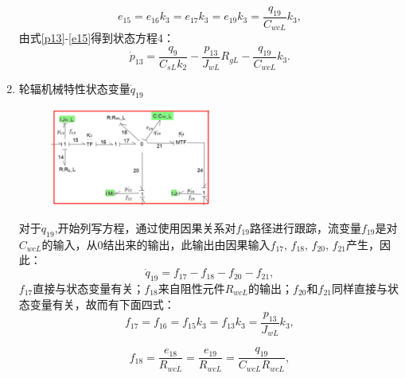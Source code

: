 \begin{enumerate}
\begin{equation}\label{e15}
e _ { 15 } = e _ { 16 } k _ { 3 } = e _ { 17 } k _ { 3 } = e _ { 19 } k _ { 3 } = \frac { q _ { 19 } } { C _ { w cL }  } k _ { 3 } ,
\end{equation}
由式\ref{p13}-\ref{e15}得到状态方程4：
\begin{equation}
\dot{ p }_ { 13 } = \frac { q _ { 9 } } { C _ { sL}  k _ { 2 } } - \frac { p _ { 13 } } { J _ { wL}  } R _ { gL }  - \frac { q _ { 19 } } { C _ { w cL}  } k _ { 3 }.
\end{equation}

\item{轮辐机械特性状态变量$\dot{ q}_{19}$}
\begin{figure}[h]
	\centering
	\includegraphics[width=0.5\textwidth]{fig/equation5.png}
	\caption{}\label{fig:equation5}
\end{figure}
对于$\dot{q} _ { 19 }$,开始列写方程，通过使用因果关系对$f_{19}$路径进行跟踪，流变量$f_{19}$是对$C_{wcL}$的输入，从0结出来的输出，此输出由因果输入$f _ { 17 }$, $f _ { 18 }$, $ f _ { 20 }$, $  f _ { 21 }$产生，因此：
\begin{equation}\label{q19}
\dot { q } _ { 19 } = f _ { 17 } - f _ { 18 } - f _ { 20 } - f _ { 21 },
\end{equation}
$f_{17}$直接与状态变量有关；$f_{18}$来自阻性元件$R _ { wcL }$的输出；$f_{20}$和$f_{21}$同样直接与状态变量有关，故而有下面四式：
\begin{equation}
f _ { 17 } = f _ { 16 } = f _ { 15 } k _ { 3 } = f _ { 13 } k _ { 3 } = \frac { p _ { 13 } } { J _ { w L} } k _ { 3 },
\end{equation}

\begin{equation}
f _ { 18 } = \frac { e _ { 18 } } { R _ { w c L}  } = \frac { e _ { 19 } } { R _ { w cL  } } = \frac { q _ { 19 } } { C _ { w c  L} R _ { w c L } },
\end{equation}


\end{enumerate}
